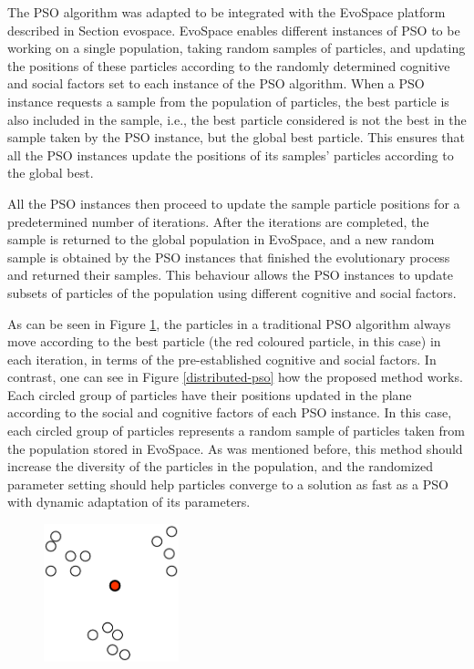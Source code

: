The PSO algorithm was adapted to be integrated with the EvoSpace
platform described in Section {evospace}. EvoSpace enables different
instances of PSO to be working on a single population, taking random
samples of particles, and updating the positions of these particles
according to the randomly determined cognitive and social factors set to each instance of the PSO algorithm. When a PSO instance requests a sample from the
population of particles, the best particle is also included in
the sample, i.e., the best particle considered is not the best in the
sample taken by the PSO instance, but the global best particle. This
ensures that all the PSO instances update the positions of its
samples' particles according to the global best.

All the PSO instances then proceed to update the sample particle
positions for a predetermined number of iterations. After the
iterations are completed, the sample is returned to the global
population in EvoSpace, and a new random sample is obtained by the PSO
instances that finished the evolutionary process and returned their
samples. This behaviour allows the PSO instances to update subsets of
particles of the population using different cognitive and social
factors.

As can be seen in Figure \ref{traditional-pso}, the particles in a
traditional PSO algorithm always move according to the best particle
(the red coloured particle, in this case) in each iteration, in terms
of the pre-established cognitive and
social factors. In contrast, one can see in Figure
\ref{distributed-pso} how the proposed method works. Each circled
group of particles have their positions updated in the plane according to the
social and cognitive factors of each PSO instance. In this case, each
circled group of particles represents a random sample of particles
taken from the population stored in EvoSpace. As was mentioned before,
this method should increase the diversity of the particles in the
population, and the randomized parameter setting should help particles
converge to a solution as fast as a PSO with dynamic adaptation of its
parameters.

\begin{figure}
  \centering
  \includegraphics[height=4cm]{pdf/traditional-pso}
  \caption{}
  \label{traditional-pso}
\end{figure}

